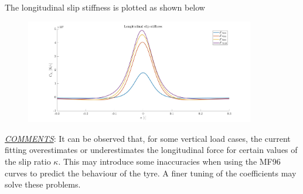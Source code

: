 \documentclass{IEEEtran}
\begin{document}
\begin{itemize}
            The longitudinal slip stiffness is plotted as shown below 

            \centerline{}
                \begin{figure}[htbp]
                    \centerline{\includegraphics[width = 3.95in]{longitudinalK.jpg}}
                    
                    \label{fig:LongStiff}
                \end{figure}
            
        \end{itemize}
        
        \textit{\underline{COMMENTS}}: It can be observed that, for some vertical load cases, the current fitting overestimates or underestimates the longitudinal force for certain values of the slip ratio $\kappa$. This may introduce some inaccuracies when using the MF96 curves to predict the behaviour of the tyre. A finer tuning of the coefficients may solve these problems. 

        \newpage
        
\end{document}
